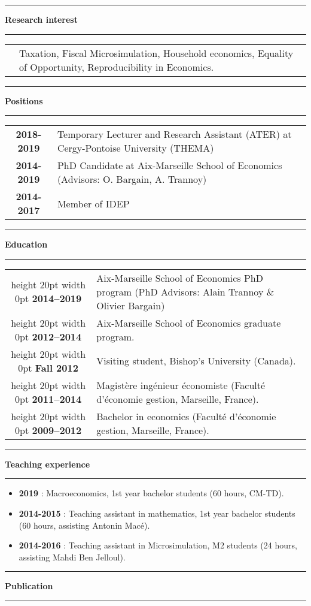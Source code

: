 \documentclass[a4paper,11pt]{article} %
\newcommand\espace{\vrule height 20pt width 0pt}
\newcommand{\titre}[1]{%
	\begin{center}
	\rule{\textwidth}{1pt}
	\par\vspace{0.1cm}
        \textbf{\large #1}
	\par\rule{\textwidth}{1pt}
	\end{center}
	}
\begin{document}
\titre{Research interest}

\begin{tabular}{c@{}p{}}

&Taxation, Fiscal Microsimulation, Household economics, Equality of Opportunity, Reproducibility in Economics.
%  
\end{tabular}

\titre{Positions}

\begin{tabular}{c@{:  }p{}}
\textbf{2018-2019} & Temporary Lecturer and Research Assistant (ATER) at Cergy-Pontoise University (THEMA) \\
 \textbf{2014-2019} & PhD Candidate at Aix-Marseille School of Economics (Advisors: O. Bargain, A. Trannoy) \\
  \textbf{2014-2017} & Member of IDEP\\
  
\end{tabular}
\titre{Education}

\begin{tabular}{c@{:  }p{}}


\espace
\textbf{2014--2019 } & Aix-Marseille School of Economics PhD program (PhD Advisors: Alain Trannoy \& Olivier Bargain) \\


\espace
\textbf{2012--2014} & Aix-Marseille School of Economics graduate program.  \\

\espace
\textbf{Fall 2012} & Visiting student, Bishop's University (Canada). \\

\espace
\textbf{2011--2014} & Magistère ingénieur économiste  (Faculté d'économie gestion, Marseille, France). \\

\espace
\textbf{2009--2012} & Bachelor in economics (Faculté d'économie gestion, Marseille, France). \\


\end{tabular}
\titre{Teaching experience}
\begin{itemize}
\item \textbf{2019} : Macroeconomics, 1st year bachelor students (60 hours, CM-TD).
\item \textbf{2014-2015} : Teaching assistant in mathematics, 1st year bachelor students (60 hours, assisting Antonin Macé).
\item \textbf{2014-2016} : Teaching assistant in Microsimulation, M2 students (24 hours, assisting Mahdi Ben Jelloul).

\end{itemize}
\newpage
\titre{Publication}
\end{document}
